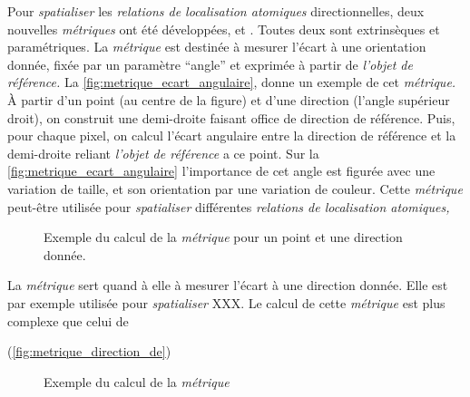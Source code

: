 Pour \emph{spatialiser} les \emph{relations de localisation atomiques}
directionnelles, deux nouvelles \emph{métriques} ont été développées,
 et . Toutes deux sont
extrinsèques et paramétriques. La \emph{métrique}
 est destinée à mesurer l'écart à une
orientation donnée, fixée par un paramètre \enquote{angle} et exprimée
à partir de \emph{l'objet de référence.} La
\autoref{fig:metrique_ecart_angulaire}, donne un exemple de cet
\emph{métrique.} À partir d'un point (au centre de la figure) et d'une
direction (l'angle supérieur droit), on construit une demi-droite
faisant office de direction de référence. Puis, pour chaque pixel, on
calcul l'écart angulaire entre la direction de référence et la
demi-droite reliant \emph{l'objet de référence} a ce point. Sur la
\autoref{fig:metrique_ecart_angulaire} l'importance de cet angle est
figurée avec une variation de taille, et son orientation par une
variation de couleur. Cette \emph{métrique} peut-être utilisée pour
\emph{spatialiser} différentes \emph{relations de localisation
  atomiques,}

\begin{figure}
  \centering
  
  \caption{Exemple du calcul de la \emph{métrique}
    \protect{} pour un point et une direction
    donnée.}
  \label{fig:metrique_ecart_angulaire}
\end{figure}

La \emph{métrique}  sert quand à elle à mesurer
l'écart à une direction donnée. Elle est par exemple utilisée pour
\emph{spatialiser} XXX.
%
Le calcul de cette \emph{métrique} est plus complexe que celui de

%
(\autoref{fig:metrique_direction_de})

\begin{figure}
  \centering
  
  \caption{Exemple du calcul de la \emph{métrique}
    \protect{}}
  \label{fig:metrique_direction_de}
\end{figure}

